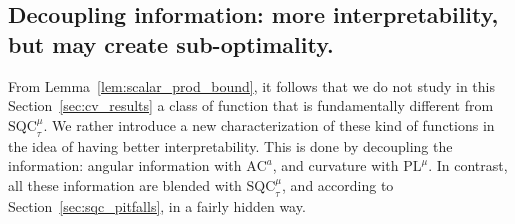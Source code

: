 \documentclass{article}
\def\R{{\mathbb{R}}}
\def\pl{{\text{PL}^\mu}}
\newcommand{\norm}[1]{\left\lVert#1\right\rVert}
\newcommand{\dotprod}[1]{\left< #1\right>}
\newcommand{\sqc}{\text{SQC}_{\tau}^{\mu}}
\newcommand{\ac}{\text{AC}^{a}}
\def\argmin{\textup{argmin}\,}
\def\arginf{\textup{arginf}\,}
\theoremstyle{plain}
\theoremstyle{definition}
\theoremstyle{remark}
\begin{document}
\subsection{Decoupling information: more interpretability, but may create sub-optimality.} 


From Lemma~\ref{lem:scalar_prod_bound}, it follows that we do not study in this Section~\ref{sec:cv_results} a class of function that is fundamentally different from $\sqc$. We rather introduce a new characterization of these kind of functions in the idea of having better interpretability. This is done by decoupling the information: angular information with $\ac$, and curvature with $\pl$. In contrast, all these information are blended with $\sqc$, and according to Section~\ref{sec:sqc_pitfalls}, in a fairly hidden way.
\end{document}
